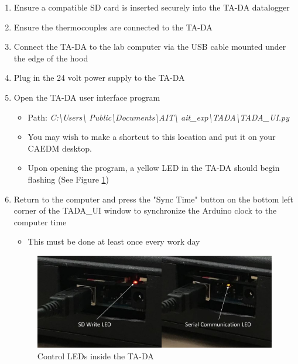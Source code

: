 \documentclass[letterpaper,11pt]{article}
\begin{document}
\begin{enumerate}
\begin{itemize}
        \end{itemize}
    
    \item Ensure a compatible SD card is inserted securely into the TA-DA 
        datalogger
    \item Ensure the thermocouples are connected to the TA-DA
    \item Connect the TA-DA to the lab computer via the USB cable mounted 
        under the edge of the hood
    \item Plug in the 24 volt power supply to the TA-DA
    \item Open the TA-DA user interface program 
            \begin{itemize}
            \item Path: \textit{C:\textbackslash Users\textbackslash  
                Public\textbackslash Documents\textbackslash AIT\textbackslash 
                ait\_exp\textbackslash TADA\textbackslash TADA\_UI.py}
            \item You may wish to make a shortcut to this location and put it on 
                your CAEDM desktop.
            \item Upon opening the program, a yellow LED in the TA-DA should 
                begin flashing (See Figure \ref{fig:tada_leds})
            \end{itemize}

    \item Return to the computer and press the "Sync Time" button on the bottom 
        left corner of the TADA\_UI
        window to synchronize the Arduino clock to the computer time
        \begin{itemize}
        \item This must be done at least once every work day
        \end{itemize}

\begin{figure}[H]
\centering
\includegraphics[width=.75\textwidth]{led_red_yellow.jpg}
\caption{Control LEDs inside the TA-DA}
\label{fig:tada_leds}
\end{figure}
        

\end{enumerate}
\end{document}

